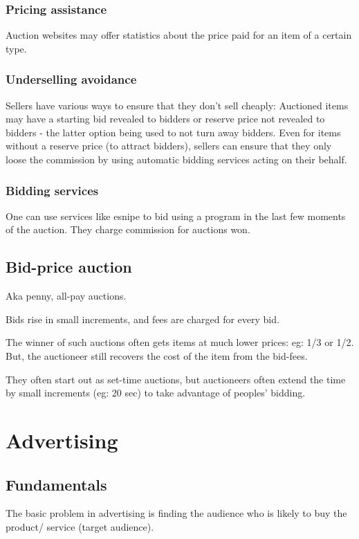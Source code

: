 \documentclass[oneside, article]{memoir}
\begin{document}
\subsection{Pricing assistance}
Auction websites may offer statistics about the price paid for an item of a certain type.

\subsection{Underselling avoidance}
Sellers have various ways to ensure that they don't sell cheaply: Auctioned items may have a starting bid revealed to bidders or reserve price not revealed to bidders - the latter option being used to not turn away bidders. Even for items without a reserve price (to attract bidders), sellers can ensure that they only loose the commission by using automatic bidding services acting on their behalf.

\subsection{Bidding services}
One can use services like esnipe to bid using a program in the last few moments of the auction. They charge commission for auctions won.

\section{Bid-price auction}
Aka penny, all-pay auctions.

Bids rise in small increments, and fees are charged for every bid.

The winner of such auctions often gets items at much lower prices: eg: 1/3 or 1/2. But, the auctioneer still recovers the cost of the item from the bid-fees. 

They often start out as set-time auctions, but auctioneers often extend the time by small increments (eg: 20 sec) to take advantage of peoples' bidding.

\chapter{Advertising}
\section{Fundamentals}
The basic problem in advertising is finding the audience who is likely to buy the product/ service (target audience).
\end{document}
